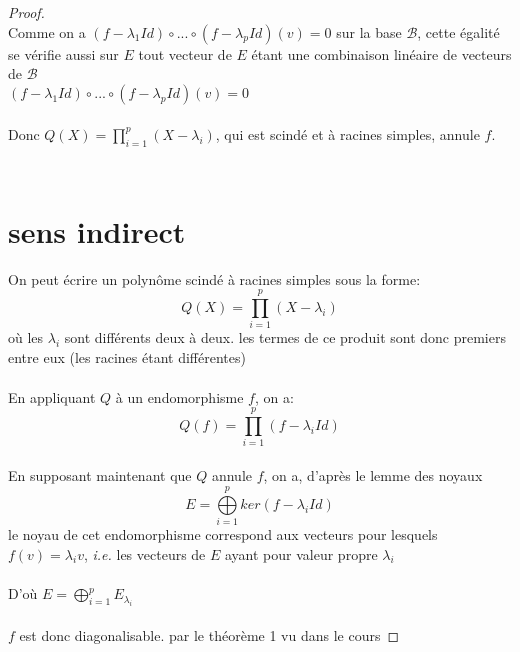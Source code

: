\documentclass{article}
\newcommand\BBB{\mathcal{B}}
\begin{document}
\begin{proof}
$\phantom{a}$\\[1cm]

	Comme on a $(f-\lambda_1 Id) \circ ... \circ (f-\lambda_p Id)(v) = 0$ %
	sur la base $\BBB$, cette égalité se vérifie aussi sur $E$
	{\tiny tout vecteur de $E$ étant une combinaison linéaire de vecteurs de $\BBB$}\\

	$(f-\lambda_1 Id) \circ ... \circ (f-\lambda_p Id)(v) = 0$

$\phantom{a}$\\[5mm]

	Donc $Q(X) = \prod\limits_{i=1}^p (X-\lambda_i)$, qui est scindé et à racines simples, annule $f$.

$\phantom{a}$\\[1cm]
$\phantom{a}$\\[1cm]
\newpage
	\section{sens indirect}
	On peut écrire un polynôme scindé à racines simples sous la forme:
	$$Q(X) = \prod\limits_{i=1}^p (X - \lambda_i)$$
	où les $\lambda_i$ sont différents deux à deux.
	{\tiny les termes de ce produit sont donc premiers entre eux (les racines étant différentes)}
	
$\phantom{a}$\\[5mm]

	En appliquant $Q$ à un endomorphisme $f$, on a:
	$$Q(f) = \prod\limits_{i=1}^p (f - \lambda_i Id)$$

$\phantom{a}$\\[1cm]

	En supposant maintenant que $Q$ annule $f$, on a, d'après le lemme des noyaux %
	$$E = \bigoplus\limits_{i=1}^p ker(f - \lambda_i Id)$$
	{\tiny le noyau de cet endomorphisme correspond aux vecteurs pour lesquels $f(v) = \lambda_i v$, \textit{i.e.} les vecteurs de $E$ ayant pour valeur propre $\lambda_i$}

$\phantom{a}$\\[1cm]

	D'où $E = \bigoplus_{i=1}^p E_{\lambda_i}$

$\phantom{a}$\\[1cm]

	$f$ est donc diagonalisable.
	{\tiny par le théorème 1 vu dans le cours}
\end{proof}
\end{document}

